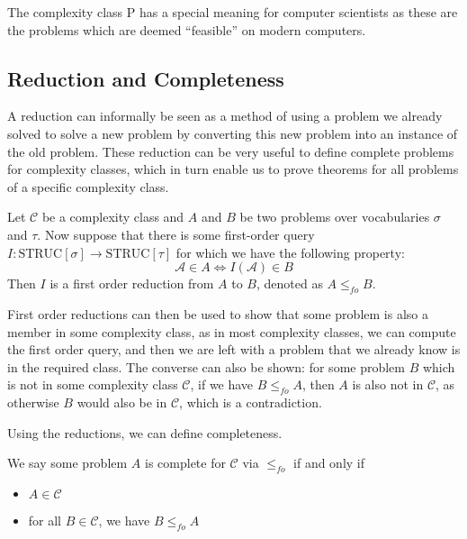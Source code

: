 The complexity class P has a special meaning for computer scientists as these are the problems which are deemed ``feasible'' on modern computers.

\subsection{Reduction and Completeness}\label{subsec:reduction}

A reduction can informally be seen as a method of using a problem we already solved to solve a new problem by converting this new problem into an instance of the old problem.
These reduction can be very useful to define complete problems for complexity classes, which in turn enable us to prove theorems for all problems of a specific complexity class.

\begin{define}
    Let $\mathcal{C}$ be a complexity class and $A$ and $B$ be two problems over vocabularies $\sigma$ and $\tau$.
    Now suppose that there is some first-order query $I: \text{STRUC}[\sigma] \to \text{STRUC}[\tau]$ for which we have the following property:
    \[
        \mathcal{A} \in A \Leftrightarrow I(\mathcal{A}) \in B
    \]
    Then $I$ is a first order reduction from $A$ to $B$, denoted as $A \leq_{fo} B$.
\end{define}

First order reductions can then be used to show that some problem is also a member in some complexity class, as in most complexity classes, we can compute the first order query, and then we are left with a problem that we already know is in the required class.
The converse can also be shown: for some problem $B$ which is not in some complexity class $\mathcal{C}$, if we have $B \leq_{fo} A$, then $A$ is also not in $\mathcal{C}$, as otherwise $B$ would also be in $\mathcal{C}$, which is a contradiction.

Using the reductions, we can define completeness.

\begin{define}
    We say some problem $A$ is complete for $\mathcal{C}$ via $\leq_{fo}$ if and only if
    \begin{itemize}
        \setlength\itemsep{0.2em}
        \item $A \in \mathcal{C}$
        \item for all $B \in \mathcal{C}$, we have $B \leq_{fo} A$
    \end{itemize}
\end{define}

